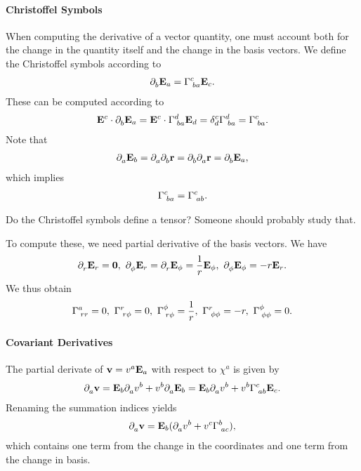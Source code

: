 \paragraph{Christoffel Symbols}
When computing the derivative of a vector quantity, one must account both for the change in the quantity itself and the change in the basis vectors. We define the Christoffel symbols according to
\begin{align*}
	\partial^{}_{b}\vb{E}_{a} = \Gamma^{c}_{\;ba}\vb{E}_{c}.
\end{align*}
These can be computed according to
\begin{align*}
	\vb{E}^{c}\cdot\partial^{}_{b}\vb{E}_{a} = \vb{E}^{c}\cdot\Gamma^{d}_{\;ba}\vb{E}_{d} = \delta_{d}^{c}\Gamma^{d}_{\;ba} = \Gamma^{c}_{\;ba}.
\end{align*}
Note that
\begin{align*}
	\partial^{}_{a}\vb{E}_{b} = \partial^{}_{a}\partial^{}_{b}\vb{r} = \partial^{}_{b}\partial^{}_{a}\vb{r} = \partial^{}_{b}\vb{E}_{a},
\end{align*}
which implies
\begin{align*}
	\Gamma^{c}_{\;ba} = \Gamma^{c}_{\;ab}.
\end{align*}

Do the Christoffel symbols define a tensor? Someone should probably study that.

To compute these, we need partial derivative of the basis vectors. We have
\begin{align*}
	\partial^{}_{r}\vb{E}_{r} = \vb{0},\ \partial^{}_{\phi}\vb{E}_{r} = \partial^{}_{r}\vb{E}_{\phi} = \frac{1}{r}\vb{E}_{\phi},\ \partial^{}_{\phi}\vb{E}_{\phi} = -r\vb{E}_{r}.
\end{align*}
We thus obtain
\begin{align*}
	\Gamma^{a}_{\;rr} = 0,\ \Gamma^{r}_{\;r\phi} = 0,\ \Gamma^{\phi}_{\;r\phi} = \frac{1}{r},\ \Gamma^{r}_{\;\phi\phi} = -r,\ \Gamma^{\phi}_{\;\phi\phi} = 0.
\end{align*}

\paragraph{Covariant Derivatives}
The partial derivate of $\vb{v} = v^{a}\vb{E}_{a}$ with respect to $\chi^{a}$ is given by
\begin{align*}
	\partial^{}_{a}\vb{v} = \vb{E}_{b}\partial^{}_{a}v^{b} + v^{b}\partial^{}_{a}\vb{E}_{b} = \vb{E}_{b}\partial^{}_{a}v^{b} + v^{b}\Gamma^{c}_{\;ab}\vb{E}_{c}.
\end{align*}
Renaming the summation indices yields
\begin{align*}
	\partial^{}_{a}\vb{v} = \vb{E}_{b}(\partial^{}_{a}v^{b} + v^{c}\Gamma^{b}_{\;ac}),
\end{align*}
which contains one term from the change in the coordinates and one term from the change in basis.

